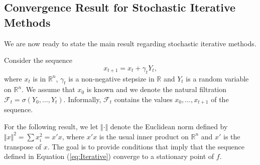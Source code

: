 \documentclass[letter,11pt]{article}
\begin{document}
\subsection{
Convergence Result for Stochastic Iterative Methods} \label{Section:Convergence}


We are now ready to state the main result regarding stochastic iterative methods. 


Consider the sequence 
\begin{equation}\label{eq:Iterative}
x_{t+1} = x_{t} + \gamma_{t} Y_{t},
\end{equation}
where $x_{t}$ is in $\mathbb{R}^{n}$, $\gamma_{t}$ is a non-negative stepsize in $\mathbb{R}$ and $Y_{t}$ is a random variable on $\mathbb{R}^{n}$.  We assume that \( x_{0} \) is known and we denote the natural filtration \( \mathcal{F}_{t} = \sigma (Y_{0}, \ldots, Y_{t}) \). Informally, \( \mathcal{F}_{t} \) contains the values \( x_{0}, \ldots, x_{t+1} \) of the sequence.

For the following result, we let \( \Vert \cdot \Vert \) denote the Euclidean norm defined by \( \Vert x \Vert ^{2} = \sum x_{i}^2 = x'x \), where \( x'x \) is the usual inner product on \( \mathbb{R}^{n} \) and \( x' \) is the transpose of \( x \).  The goal is to provide conditions that imply that the sequence defined in Equation (\ref{eq:Iterative}) converge to a stationary point of $f$.
\end{document}
